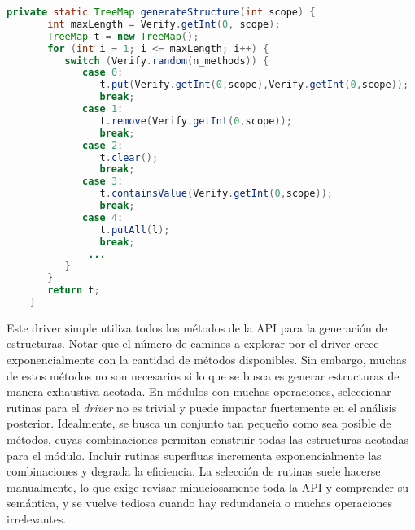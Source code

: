 

\begin{lstlisting}[language=Java,caption={Controlador usando todos los métodos
de la API},label={lst:driverAPI},captionpos=b]
    private static TreeMap generateStructure(int scope) {
       int maxLength = Verify.getInt(0, scope);
       TreeMap t = new TreeMap();
       for (int i = 1; i <= maxLength; i++) {
          switch (Verify.random(n_methods)) {
             case 0:
                t.put(Verify.getInt(0,scope),Verify.getInt(0,scope));
                break;
             case 1:
                t.remove(Verify.getInt(0,scope));
                break;						
             case 2:
                t.clear();
                break;
             case 3:
                t.containsValue(Verify.getInt(0,scope));
                break;
             case 4: 
                t.putAll(l);
                break;
              ...
          }
       }
       return t;
    }
\end{lstlisting}


Este driver simple utiliza todos los métodos de la API para la generación de
estructuras. Notar que el número de caminos a explorar por el driver crece exponencialmente con la cantidad de métodos disponibles. Sin embargo, muchas de estos métodos no son necesarios si
lo que se busca es generar estructuras de manera exhaustiva acotada. 
En módulos con muchas operaciones, seleccionar rutinas para el \emph{driver} no es trivial y puede impactar fuertemente en el
análisis posterior. Idealmente, se busca un conjunto tan pequeño como sea
posible de métodos, cuyas combinaciones permitan construir todas las
estructuras acotadas para el módulo. Incluir rutinas superfluas incrementa exponencialmente las combinaciones y degrada la eficiencia. 
La selección de rutinas suele hacerse manualmente, lo que exige revisar minuciosamente toda la API y comprender su semántica, y se vuelve tediosa cuando hay redundancia o muchas operaciones irrelevantes.

